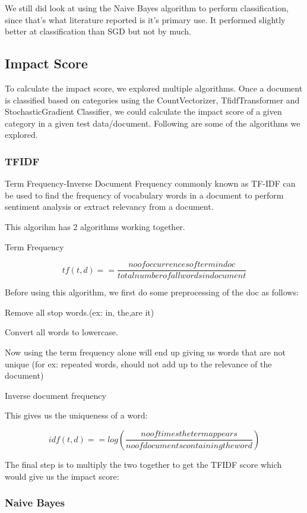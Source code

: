 \documentclass{article}
\begin{document}
We still did look at using the Naive Bayes algorithm to perform classification, since that's what literature reported is it's primary use. It performed slightly better at classification than SGD but not by much.

\subsection {Impact Score}
To calculate the impact score, we explored multiple algorithms. Once a document is classified based on categories using the CountVectorizer, TfidfTransformer and StochasticGradient Classifier, we could calculate the impact score of a given category in a given test data/document. Following are some of the algorithms we explored.
\subsubsection{TFIDF}
Term Frequency-Inverse Document Frequency commonly known as TF-IDF can be used to find the frequency of vocabulary words in a document to perform sentiment analysis or extract relevancy from a document.

This algorihm has 2 algorithms working together.
\item
Term Frequency

\[tf(t,d) =  = \frac{no of occurrences of term in doc }{total number of all words in document}\]

Before using this algorithm, we first do some preprocessing of the doc as follows:
\item Remove all stop words.(ex: in, the,are it)
\item Convert all words to lowercase.

Now using the term frequency alone will end up giving us words that are not unique (for ex: repeated words, should not add up to the relevance of the document)
 \item Inverse document frequency

 This gives us the uniqueness of a word:

 \[idf(t,d) =  = log(\frac{no of times the term appears }{no of documents containing the word})\]

 The final step is to multiply the two together to get the TFIDF score which would give us the impact score:



\subsubsection{Naive Bayes}
\end{document}
